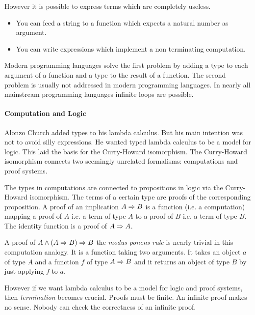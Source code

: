 However it is possible to express terms which are completely useless.

\begin{itemize}

\item You can feed a string to a function which expects a natural number as
argument.

\item You can write expressions which implement a non terminating computation.

\end{itemize}

Modern programming languages solve the first problem by adding a type to each
argument of a function and a type to the result of a function. The second
problem is usually not addressed in modern programming languages. In nearly all
mainstream programming languages infinite loops are possible.





\paragraph{Computation and Logic}
Alonzo Church added types to his lambda calculus. But his main intention was not
to avoid silly expressions. He wanted typed lambda calculus to be a model for
logic. This laid the basis for the Curry-Howard isomorphism. The Curry-Howard
isomorphism connects two seemingly unrelated formalisms: computations and proof
systems.

The types in computations are connected to propositions in logic via the
Curry-Howard isomorphism. The terms of a certain type are proofs of the
corresponding proposition. A proof of an implication $A \Rightarrow B$ is a function
(i.e. a computation) mapping a proof of $A$ i.e. a term of type $A$ to a
proof of $B$ i.e. a term of type $B$. The identity function is a proof of $A
\Rightarrow A$.

A proof of $A \land (A \Rightarrow B) \Rightarrow B$ the \emph{modus ponens rule} is nearly
trivial in this computation analogy. It is a function taking two arguments. It
takes an object $a$ of type $A$ and a function $f$ of type $A \Rightarrow B$ and it
returns an object of type $B$ by just applying $f$ to $a$.

However if we want lambda calculus to be a model for logic and proof systems,
then \emph{termination} becomes crucial. Proofs must be finite. An infinite
proof makes no sense. Nobody can check the correctness of an infinite proof.

